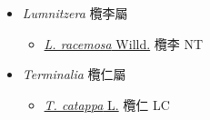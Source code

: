 
  \begin{itemize}
 \item[] \textit{Lumnitzera} 欖李屬
                    
  \begin{itemize}
        \item[] \href{http://www.theplantlist.org/tpl1.1/search?q=Lumnitzera+racemosa}{\textit{L. racemosa} Willd.}   欖李 NT
  \end{itemize}
 \item[] \textit{Terminalia} 欖仁屬
                    
  \begin{itemize}
        \item[] \href{http://www.theplantlist.org/tpl1.1/search?q=Terminalia+catappa}{\textit{T. catappa} L.}   欖仁 LC
  \end{itemize}
  \end{itemize}
